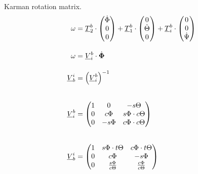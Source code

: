 Karman rotation matrix. 
\begin{align}
	\omega &= \underline{T}_2^b \cdot \begin{pmatrix} \dot{\Phi}  \\ 0 \\ 0 \end{pmatrix} + \underline{T}_1^b \cdot \begin{pmatrix} 0  \\ \dot{\Theta} \\ 0 \end{pmatrix} + \underline{T}_i^b \cdot \begin{pmatrix} 0  \\ 0 \\ \dot{\Psi} \end{pmatrix} 
	\\[1em]
	\omega &= \underline{V}_i^b \cdot \dot{\boldsymbol{\Phi}} \\[1em]
	\underline{V}_b^i &= \left(\underline{V}_i^b \right)^{-1}
	\\[2em]
	\underline{V}_i^b &= \begin{pmatrix}
		1 & 0 & -s{\Theta} 	\\
		0 & c{\Phi} & s{\Phi} \cdot c{\Theta} 	\\
		0 & -s{\Phi} & c{\Phi} \cdot c{\Theta}
	\end{pmatrix} \label{eq:Vib}
	\\[2em]
	\underline{V}_b^i &= \begin{pmatrix}
		1 & s{\Phi} \cdot t\Theta & c{\Phi} \cdot t\Theta 	\\
		0 & c{\Phi} & -s{\Phi} 	\\
		0 & \frac{s{\Phi}}{c{\Theta}} & \frac{c{\Phi}}{c{\Theta}}
	\end{pmatrix} \label{eq:Vbi}
\end{align}
\clearpage